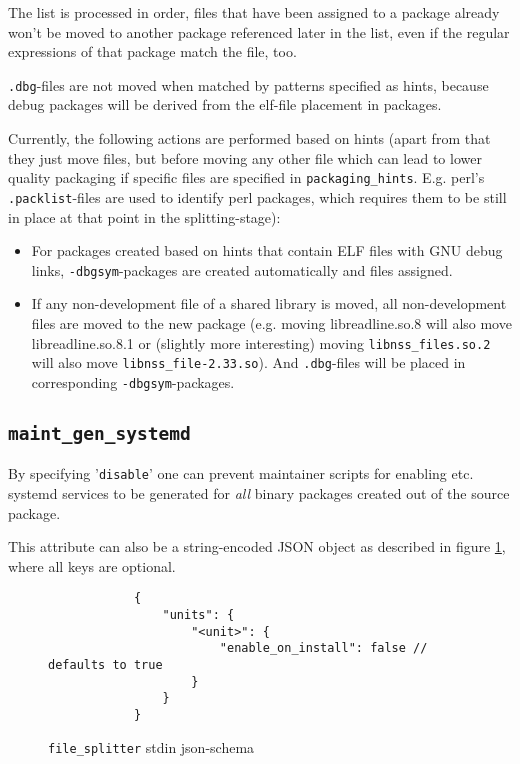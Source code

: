 \documentclass[a4paper]{scrartcl}
\newcommand{\file}[1]{\texttt{#1}}
\begin{document}
	The list is processed in order, files that have been assigned to a package already won't be moved to another package referenced later in the list, even if the regular expressions of that package match the file, too.
	
	\file{.dbg}-files are not moved when matched by patterns specified as hints, because debug packages will be derived from the elf-file placement in packages.
	
	Currently, the following actions are performed based on hints (apart from that they just move files, but before moving any other file which can lead to lower quality packaging if specific files are specified in \texttt{packaging\_hints}. E.g. perl's \file{.packlist}-files are used to identify perl packages, which requires them to be still in place at that point in the splitting-stage):
	
	\begin{itemize}
		\item For packages created based on hints that contain ELF files with GNU debug links, \texttt{-dbgsym}-packages are created automatically and files assigned.
		
		\item If any non-development file of a shared library is moved, all non-development files are moved to the new package (e.g. moving libreadline.so.8 will also move libreadline.so.8.1 or (slightly more interesting) moving \file{libnss\_files.so.2} will also move \file{libnss\_file-2.33.so}). And \file{.dbg}-files will be placed in corresponding \texttt{-dbgsym}-packages.
	\end{itemize}

	\subsection{\texttt{maint\_gen\_systemd}}
	\label{sec:maint_gen_systemd}
	
	By specifying '\texttt{disable}' one can prevent maintainer scripts for enabling etc. systemd services to be generated for \textit{all} binary packages created out of the source package.
	
	This attribute can also be a string-encoded JSON object as described in figure \ref{fig:maint_gen_systemd_json}, where all keys are optional.
	
	\begin{figure}[H]
		\centering
		\begin{minipage}{0.8\textwidth}
			\begin{lstlisting}
			{
				"units": {
					"<unit>": {
						"enable_on_install": false // defaults to true
					}
				}
			}
			\end{lstlisting}
		\end{minipage}
		
		\caption{\texttt{file\_splitter} stdin json-schema}
		\label{fig:maint_gen_systemd_json}
	\end{figure}
	
\end{document}
